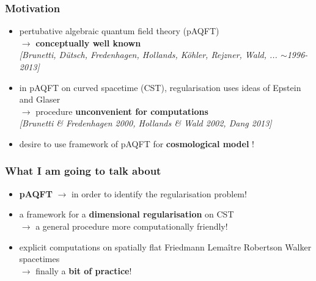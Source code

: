\documentclass[9pt]{beamer}
\newcommand{\citebeam}[1]{\textit{\textcolor{black!60!white}{[#1]}}} %
\begin{document}

\begin{frame}

\frametitle{Motivation}
  
\begin{itemize}
    
\item pertubative algebraic quantum field theory (pAQFT) \\
$\to$ \textbf{conceptually well known} \\
\citebeam{Brunetti, Dütsch, Fredenhagen, Hollands, K\"ohler, Rejzner, Wald, ... $\sim$1996-2013} \\
    
\item in pAQFT on curved spacetime (CST), regularisation uses ideas of Epstein and Glaser \\
$\to$ procedure \textbf{unconvenient for computations} \\
\citebeam{Brunetti \& Fredenhagen 2000, Hollands \& Wald 2002, Dang 2013} \\
    
\item desire to use framework of pAQFT for \textbf{cosmological model} ! \\
  
\end{itemize}

\end{frame}


\begin{frame}

\frametitle{What I am going to talk about}
  
\begin{itemize}
   
\item \textbf{pAQFT} $\to$ in order to identify the regularisation problem! \\
  
\item a framework for a \textbf{dimensional regularisation} on CST \\
$\to$ a general procedure more computationally friendly! \\
   
\item explicit computations on spatially flat Friedmann Lemaître Robertson Walker spacetimes \\
$\to$ finally a \textbf{bit of practice}!
   
\end{itemize}

\end{frame}
\end{document}
